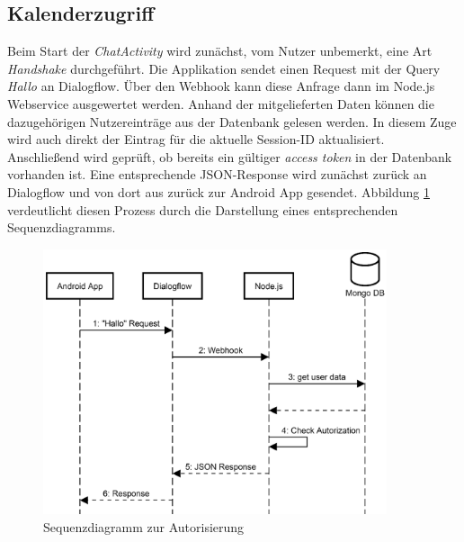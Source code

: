 \FloatBarrier
\subsection{Kalenderzugriff}
\label{subsec:authorization-prozess}

Beim Start der \textit{ChatActivity} wird zunächst, vom Nutzer unbemerkt, eine Art \textit{Handshake} durchgeführt. Die Applikation sendet einen Request mit der Query \textit{Hallo} an Dialogflow. Über den Webhook kann diese Anfrage dann im Node.js Webservice ausgewertet werden. Anhand der mitgelieferten Daten können die dazugehörigen Nutzereinträge aus der Datenbank gelesen werden. In diesem Zuge wird auch direkt der Eintrag für die aktuelle Session-\ac{ID} aktualisiert. Anschließend wird geprüft, ob bereits ein gültiger \textit{access token} in der Datenbank vorhanden ist. Eine entsprechende \ac{JSON}-Response wird zunächst zurück an Dialogflow und von dort aus zurück zur Android App gesendet. Abbildung \ref{fig:sequence-diagramm-authorization-flow} verdeutlicht diesen Prozess durch die Darstellung eines entsprechenden Sequenzdiagramms.
\newline

\begin{figure}[H]
    \centering
    \includegraphics[width=0.9\textwidth]{bilder/Authorization-Flow.png}
    \caption{Sequenzdiagramm zur Autorisierung}
    \label{fig:sequence-diagramm-authorization-flow}
\end{figure}

